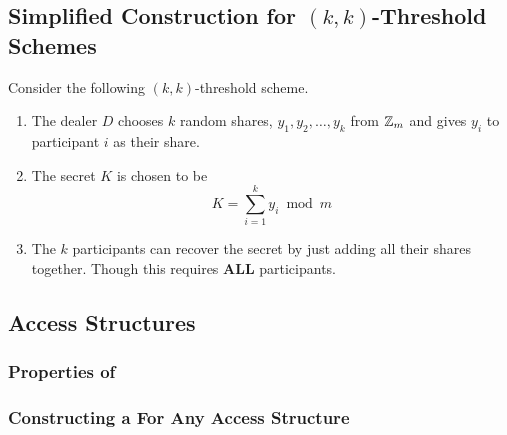 \subsection{\texorpdfstring{Simplified Construction for $(k, k)$-Threshold Schemes}{Simplified Construction for Threshold Schemes}}\label{subsec:Simplified_Construction_Threshold_Schemes}
Consider the following $(k, k)$-threshold scheme.
\begin{enumerate}[noitemsep]
\item The dealer $D$ chooses $k$ random shares, $y_{1}, y_{2}, \ldots, y_{k}$ from $\operatorname{\mathbb{Z}}_{m}$ and gives $y_{i}$ to participant $i$ as their share.
\item The secret $K$ is chosen to be
  \begin{equation}\label{eq:Simplified_Construction_Threshold_Scheme}
    K = \sum\limits_{i=1}^{k}y_{i} \bmod m
  \end{equation}
\item The $k$ participants can recover the secret by just adding all their shares together. Though this requires \textbf{ALL} participants.
\end{enumerate}

\subsection{Access Structures}\label{subsec:Access_Structures}
\subsubsection{Properties of }\label{subsubsec:Properties_Access_Structures}
\subsubsection{Constructing a  For Any Access Structure}\label{subsubsec:Construct_Perfect_Secret_Sharing_Scheme}
